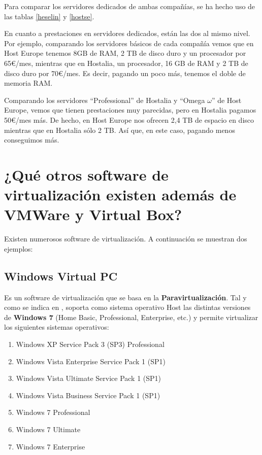 \documentclass[10pt,a4paper,spanish]{article}
\numberwithin{equation}{section} %
\numberwithin{figure}{section} %
\numberwithin{table}{section} %
\begin{document}
Para comparar los servidores dedicados de ambas compañías, se ha hecho uso de las tablas \hyperref[heselin]{\ref*{heselin}} y \hyperref[hostse]{\ref*{hostse}}.

En cuanto a prestaciones en servidores dedicados, están las dos al mismo nivel. Por ejemplo, comparando los servidores básicos de cada compañía vemos que en Host Europe tenemos 8GB de RAM, 2 TB de disco duro y un procesador por 65\euro/mes, mientras que en Hostalia, un procesador, 16 GB de RAM y 2 TB de disco duro por 70\euro/mes. Es decir, pagando un poco más, tenemos el doble de memoria RAM. 

Comparando los servidores ``Professional'' de Hostalia y ``Omega $\omega$'' de Host Europe, vemos que tienen prestaciones muy parecidas, pero en Hostalia pagamos 50\euro/mes más. De hecho, en Host Europe nos ofrecen 2,4 TB de espacio en disco mientras que en Hostalia sólo 2 TB. Así que, en este caso, pagando menos conseguimos más.

\newpage
\section{¿Qué otros software de virtualización existen además de VMWare y Virtual Box?}
Existen numerosos software de virtualización. A continuación se muestran dos ejemplos:
\subsection{Windows Virtual PC}
Es un software de virtualización que se basa en la \textbf{Paravirtualización}. Tal y como se indica en \cite{windowsvpc}, soporta como sistema operativo Host las distintas versiones de \textbf{Windows 7} (Home Basic, Professional, Enterprise, etc.) y permite virtualizar los siguientes sistemas operativos:
\begin{enumerate}[$\bullet$]
    \item Windows XP Service Pack 3 (SP3) Professional
    \item Windows Vista Enterprise Service Pack 1 (SP1)
    \item Windows Vista Ultimate Service Pack 1 (SP1)
    \item Windows Vista Business Service Pack 1 (SP1)
    \item Windows 7 Professional
    \item Windows 7 Ultimate
    \item Windows 7 Enterprise
\end{enumerate}
\end{document}
